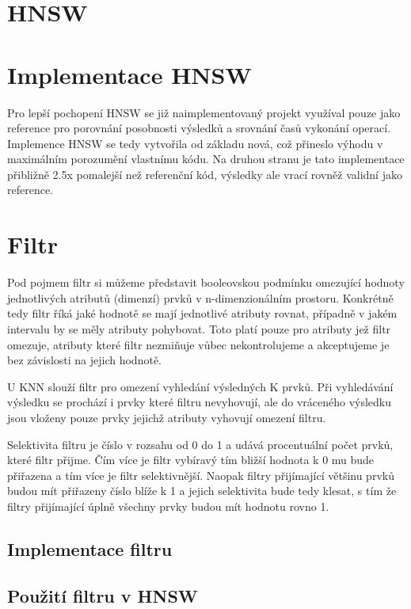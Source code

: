 \documentclass[czech,semestral,dept460,male,csharp,cpdeclaration]{diploma}
\begin{document}
	\section{HNSW}
	
	\section{Implementace HNSW}
	
		Pro lepší pochopení HNSW se již naimplementovaný projekt využíval pouze jako reference pro porovnání posobnosti výsledků a srovnání časů vykonání operací. Implemence HNSW se tedy vytvořila od základu nová, což přineslo výhodu v maximálním porozumění vlastnímu kódu. Na druhou stranu je tato implementace přibližně 2.5x pomalejší než referenční kód, výsledky ale vrací rovněž validní jako reference.
	
	\section{Filtr}
	
		Pod pojmem filtr si můžeme představit booleovskou podmínku omezující hodnoty jednotlivých atributů (dimenzí) prvků v n-dimenzionálním prostoru. Konkrétně tedy filtr říká jaké hodnotě se mají jednotlivé atributy rovnat, případně v jakém intervalu by se měly atributy pohybovat. Toto platí pouze pro atributy jež filtr omezuje, atributy které filtr nezmiňuje vůbec nekontrolujeme a akceptujeme je bez závislosti na jejich hodnotě.
		
		U KNN slouží filtr pro omezení vyhledání výsledných K prvků. Při vyhledávání výsledku se prochází i prvky které filtru nevyhovují, ale do vráceného výsledku jsou vloženy pouze prvky jejichž atributy vyhovují omezení filtru.
		
		Selektivita filtru je číslo v rozsahu od 0 do 1 a udává procentuální počet prvků, které filtr přijme. Čím více je filtr vybíravý tím bližší hodnota k 0 mu bude přiřazena a tím více je filtr selektivnější. Naopak filtry přijímající většinu prvků budou mít přiřazeny číslo blíže k 1 a jejich selektivita bude tedy klesat, s tím že filtry přijímající úplně všechny prvky budou mít hodnotu rovno 1.
		
		\subsection{Implementace filtru}
		
		\subsection{Použití filtru v HNSW}
		
\end{document}

